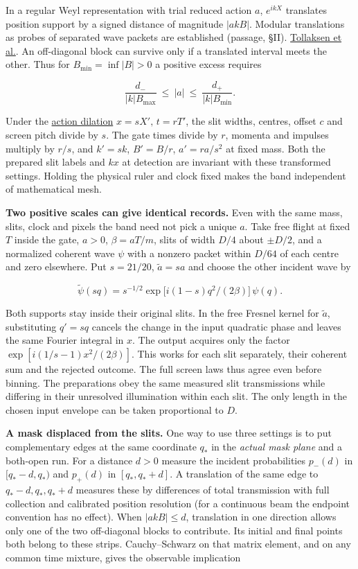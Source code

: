 \documentclass[11pt,a4paper]{article}
\begin{document}
In a regular Weyl representation with trial reduced action \(a\),
\(e^{ikX}\) translates position support by a signed distance of
magnitude \(|akB|\). Modular translations as probes of separated wave
packets are established (passage, §II).
\href{https://arxiv.org/pdf/0910.4227}{Tollaksen et al.}. An
off-diagonal block can survive only if a translated interval meets the
other. Thus for \(B_{\min}=\inf|B|>0\) a positive excess requires

\[
 \frac{d_-}{|k|B_{\max}}\ \le\ |a|\ \le\
 \frac{d_+}{|k|B_{\min}} .
\]

Under the
\href{groupoid-quantum-newton-states.md\#7-interacting-kernels-under-tangent-scaling}{action
dilation} \(x=sX',\,t=rT'\), the slit widths, centres, offset \(c\) and
screen pitch divide by \(s\). The gate times divide by \(r\), momenta
and impulses multiply by \(r/s\), and \(k'=sk\), \(B'=B/r\),
\(a'=ra/s^2\) at fixed mass. Both the prepared slit labels and \(kx\) at
detection are invariant with these transformed settings. Holding the
physical ruler and clock fixed makes the band independent of
mathematical mesh.

\textbf{Two positive scales can give identical records.} Even with the
same mass, slits, clock and pixels the band need not pick a unique
\(a\). Take free flight at fixed \(T\) inside the gate, \(a>0\),
\(\beta=aT/m\), slits of width \(D/4\) about \(\pm D/2\), and a
normalized coherent wave \(\psi\) with a nonzero packet within \(D/64\)
of each centre and zero elsewhere. Put \(s=21/20\), \(\tilde a=sa\) and
choose the other incident wave by

\[
 \tilde\psi(sq)=s^{-1/2}
       \exp\!\big[i(1-s)q^2/(2\beta)\big]\,\psi(q).
\]

Both supports stay inside their original slits. In the free Fresnel
kernel for \(\tilde a\), substituting \(q'=sq\) cancels the change in
the input quadratic phase and leaves the same Fourier integral in \(x\).
The output acquires only the factor \(\exp[i(1/s-1)x^2/(2\beta)]\). This
works for each slit separately, their coherent sum and the rejected
outcome. The full screen laws thus agree even before binning. The
preparations obey the same measured slit transmissions while differing
in their unresolved illumination within each slit. The only length in
the chosen input envelope can be taken proportional to \(D\).

\textbf{A mask displaced from the slits.} One way to use three settings
is to put complementary edges at the same coordinate \(q_*\) in the
\emph{actual mask plane} and a both-open run. For a distance \(d>0\)
measure the incident probabilities \(p_-(d)\) in \([q_*-d,q_*)\) and
\(p_+(d)\) in \([q_*,q_*+d]\). A translation of the same edge to
\(q_*-d,q_*,q_*+d\) measures these by differences of total transmission
with full collection and calibrated position resolution (for a
continuous beam the endpoint convention has no effect). When
\(|akB|\le d\), translation in one direction allows only one of the two
off-diagonal blocks to contribute. Its initial and final points both
belong to these strips. Cauchy--Schwarz on that matrix element, and on
any common time mixture, gives the observable implication
\end{document}

